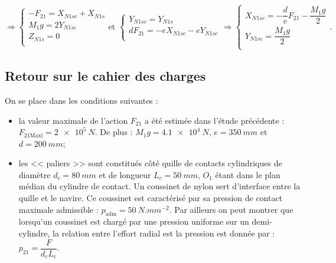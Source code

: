 \begin{multicols}{2}
\begin{corrige}
$$
\Rightarrow 
\left\{
\begin{array}{l}
- F_{21} = X_{N1sc}+X_{N1s} \\
M_1g= 2Y_{N1sc} \\
Z_{N1s} = 0  \\
\end{array}
\right.
\text{et }
\left\{
\begin{array}{l}
 Y_{N1sc}= Y_{N1s} \\
dF_{21}= -e X_{N1sc}-e Y_{N1sc} \\
\end{array}
\right.
\Rightarrow 
\left\{
\begin{array}{l}
X_{N1sc}=-\dfrac{d}{e}F_{21} - \dfrac{M_1g}{2} \\
Y_{N1sc} = \dfrac{M_1g}{2}\\%
\end{array}
\right. .
$$

\end{corrige}
\else
\fi



\subsection*{Retour sur le cahier des charges}
\ifprof
\else

On se place dans les conditions suivantes :
\begin{itemize}
\item la valeur maximale de l’action $F_{21}$ a été estimée dans l’étude précédente : $F_{21\text{Maxi}}=\SI{2e5}{N}$. De
plus : $M_1 g = \SI{4,1e4}{N}$, $e=\SI{350}{mm}$ et $d=\SI{200}{mm}$;
\item les << paliers >> sont constitués côté quille de contacts cylindriques de diamètre $d_c =\SI{80}{mm}$ et de longueur $L_c =\SI{50}{mm}$, $O_1$ étant dans le plan médian du cylindre de contact. Un coussinet de nylon
sert d’interface entre la quille et le navire. Ce coussinet est caractérisé par sa pression de contact
maximale admissible : $p_{\text{adm}}= \SI{50}{N.mm^{-2}}$. Par ailleurs on peut montrer que lorsqu'un coussinet est chargé par une pression uniforme sur un demi-cylindre, la relation entre l'effort radial est la pression est donnée par : $p_{21}=\dfrac{F}{d_cL_c}$.
\end{itemize}
\fi


\end{multicols}
